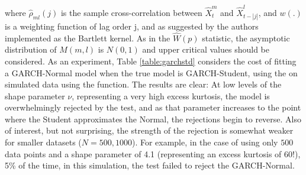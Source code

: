 where ${{\hat \rho }_{ml}}\left( j \right)$ is the sample cross-correlation
between $\hat X_t^m$ and $\hat X_{t - \left| j \right|}^l$, and $w\left(.\right)$
is a weighting function of lag order j, and as suggested by the authors implemented
as the Bartlett kernel. As in the $\hat W\left( p \right)$ statistic, the asymptotic
distribution of $M\left( {m,l} \right)$ is $N\left(0,1\right)$ and upper critical
values should be considered. As an experiment, Table \ref{table:garchstd} considers
the cost of fitting a GARCH-Normal model when the true model is GARCH-Student,
using the \verb@HLTest@ on simulated data using the \verb@ugarchsim@ function.
The results are clear: At low levels of the shape parameter $\nu$, representing
a very high excess kurtosis, the model is overwhelmingly rejected by the test,
and as that parameter increases to the point where the Student approximates the
Normal, the rejections begin to reverse. Also of interest, but not surprising,
the strength of the rejection is somewhat weaker for smaller datasets ($N=500,1000$).
For example, in the case of using only $500$ data points and a shape parameter
of 4.1 (representing an excess kurtosis of 60!), 5\% of the time, in this
simulation, the test failed to reject the GARCH-Normal.
